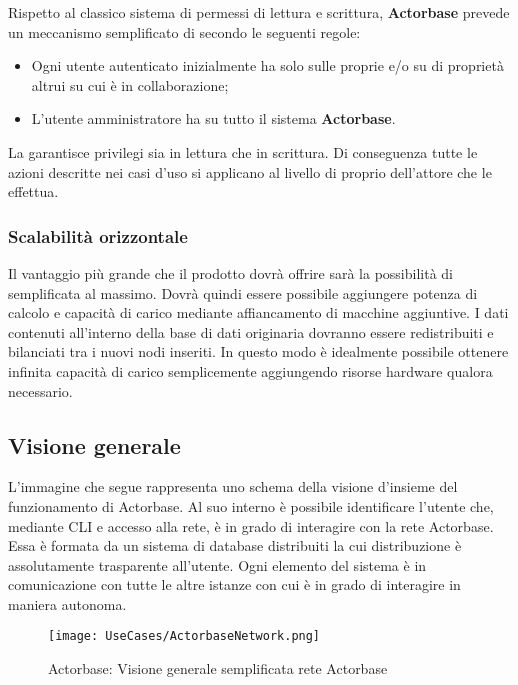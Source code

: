 \documentclass{scalatekids-article}
\begin{document}
Rispetto al classico sistema di permessi di lettura e scrittura, \textbf{Actorbase}
prevede un meccanismo semplificato di  secondo le seguenti regole:
\begin{itemize}
\item Ogni utente autenticato inizialmente ha  solo sulle proprie  e/o su  di proprietà altrui su cui è in collaborazione;
\item L'utente amministratore ha  su tutto il sistema \textbf{Actorbase}.
\end{itemize}
La  garantisce privilegi sia in lettura che in scrittura. Di
conseguenza tutte le azioni descritte nei casi d'uso si applicano al livello di
 proprio dell'attore che le effettua.

\subsubsection{Scalabilità orizzontale}

Il vantaggio più grande che il prodotto dovrà offrire sarà la possibilità di
 semplificata al massimo. Dovrà quindi essere possibile
aggiungere potenza di calcolo e capacità di carico mediante affiancamento di
macchine aggiuntive. I dati contenuti all'interno della base di dati originaria
dovranno essere redistribuiti e bilanciati tra i nuovi nodi inseriti. In questo
modo è idealmente possibile ottenere infinita capacità di carico semplicemente
aggiungendo risorse hardware qualora necessario.

\subsection{Visione generale}

L'immagine che segue rappresenta uno schema della visione d'insieme del
funzionamento di Actorbase. Al suo interno è possibile identificare l'utente
che, mediante CLI e accesso alla rete, è in grado di interagire con la rete
Actorbase. Essa è formata da un sistema di database distribuiti la cui
distribuzione è assolutamente trasparente all'utente. Ogni elemento del sistema
è in comunicazione con tutte le altre istanze con cui è in grado di interagire
in maniera autonoma.
\begin{figure}[H]
  \begin{center}
    \texttt{[image: UseCases/ActorbaseNetwork.png]}
    \caption*{Actorbase: Visione generale semplificata rete Actorbase}
  \end{center}
\end{figure}
\end{document}
